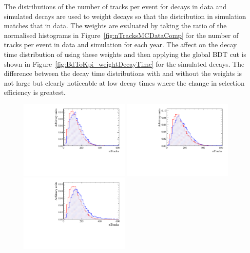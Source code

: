 The distributions of the number of tracks per event for \bdkpi decays in data and simulated decays are used to weight \bdkpi decays so that the distribution in simulation matches that in data. The weights are evaluated by taking the ratio of the normalised histograms in Figure~\ref{fig:nTracksMCDataComp} for the number of tracks per event in data and simulation for each year. The affect on the decay time distribution of using these weights and then applying the global BDT cut is shown in Figure~\ref{fig:BdToKpi_weightDecayTime} for the simulated \bdkpi decays. The difference between the decay time distributions with and without the weights is not large but clearly noticeable at low decay times where the change in selection efficiency is greatest. 


\begin{figure}[tbp]
  \centering
    \includegraphics[width=0.49\textwidth]{./Figs/LifetimeMeasurement/Bd2KPi_2011_data_MC_nTracks.pdf}
    \includegraphics[width=0.49\textwidth]{./Figs/LifetimeMeasurement/Bd2KPi_2012_data_MC_nTracks.pdf}
    \includegraphics[width=0.49\textwidth]{./Figs/LifetimeMeasurement/Bd2KPi_2015_data_MC_nTracks.pdf}

\end{figure}
